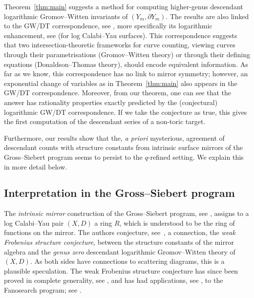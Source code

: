 \documentclass[11pt]{amsart}
\numberwithin{equation}{section}
\theoremstyle{plain}
\theoremstyle{remark}
\theoremstyle{definition}
\begin{document}
Theorem~\ref{thm:main} suggests a method for computing higher-genus descendant logarithmic Gromov--Witten invariants of $(Y_m,\partial Y_m)$. The results are also linked to the GW/DT correspondence, see \cite{maulik2006gromov,maulik2006gromov2}, more specifically its logarithmic enhancement, see \cite{maulik2025logarithmicenumerativegeometrycurves} (for log Calabi--Yau surfaces). This correspondence suggests that two intersection-theoretic frameworks for curve counting, viewing curves through their parametrisations (Gromov--Witten theory) or through their defining equations (Donaldson--Thomas theory), should encode equivalent information. As far as we know, this correspondence has no link to mirror symmetry; however, an exponential change of variables as in Theorem~\ref{thm:main} also appears in the GW/DT correspondence. Moreover, from our theorem, one can see that the answer has rationality properties exactly predicted by the (conjectural) logarithmic GW/DT correspondence. If we take the conjecture as true, this gives the first computation of the descendant series of a non-toric target.


Furthermore, our results show that the, \textit{a priori} mysterious, agreement of descendant counts with structure constants from intrinsic surface mirrors of the Gross--Siebert program seems to persist to the $q$-refined setting. We explain this in more detail below.

\subsection*{Interpretation in the Gross--Siebert program}\label{section : gross-siebert program} The \emph{intrinsic mirror} construction of the Gross--Siebert program, see \cite{gross2021intrinsic,gross2022canonical}, assigns to a log Calabi--Yau pair $(X,D)$ a ring $R$, which is understood to be the ring of functions on the mirror. The authors conjecture, see~\cite[Conjecture 9.2]{gross2021intrinsic}, a connection, the \emph{weak Frobenius structure conjecture}, between the structure constants of the mirror algebra and the \emph{genus zero} descendant logarithmic Gromov--Witten theory of $(X,D)$. As both sides have connections to scattering diagrams, this is a plausible speculation. 
The weak Frobenius structure conjecture has since been proved in complete generality, see \cite{johnston2022comparison}, and has had applications, see \cite{mandel2019fanomirrorperiodsfrobenius,johnston2025quantumperiodstoricdegenerations}, to the Fanosearch program; see \cite{coates2013mirror}.
\end{document}
